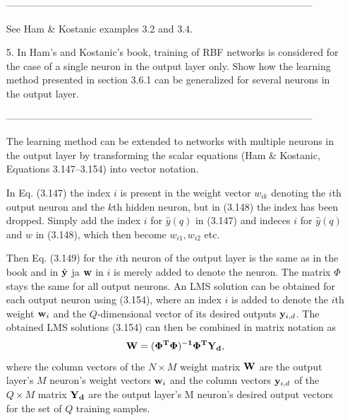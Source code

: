 \documentclass[10pt]{article}
\begin{document}
\begin{enumerate}
---------------------------------------------------------------------------------------------

See Ham \& Kostanic examples 3.2 and 3.4.

\vspace{2mm}

\vspace{2cm}
\item[5.] In Ham's and Kostanic's book, training of RBF networks is considered for the
  case of a single neuron in the output layer only. Show how the learning method
  presented in section 3.6.1 can be generalized for several neurons in the
  output layer.

---------------------------------------------------------------------------------------------

The learning method can be extended to networks with multiple neurons
in the output layer by transforming the scalar equations (Ham \&
Kostanic, Equations 3.147--3.154) into vector notation.

In Eq. (3.147) the index $i$ is present in the weight vector $w_{ik}$
denoting the $i$th output neuron and the $k$th hidden neuron, but in
(3.148) the index has been dropped. Simply add the index $i$ for
$\hat{y}(q)$ in (3.147) and indeces $i$ for $\hat{y}(q)$ and $w$ in
(3.148), which then become $w_{i1}, w_{i2}$ etc.


Then Eq. (3.149) for the $i$th neuron of the output layer is the same
  as in the book and in  $\hat{{\bf y}}$ ja ${\bf w}$ in $i$ is merely
  added to denote the neuron. The matrix $\Phi$ stays the same for all
  output neurons. An LMS solution can be obtained for each output
  neuron using (3.154), where an index $i$
  is added to denote the $i$th weight ${\bf w}_i$ and the
  $Q$-dimensional vector of its desired outputs ${\bf y}_{i,d}$.
  The obtained LMS solutions (3.154) can then be combined in matrix
  notation as
  \[
      \bf{W} = (\Phi^T \Phi)^{-1}\Phi^T \bf{Y}_d,\] 
  where the column vectors of the $N\times M$ weight matrix $\bf{W}$ are the output layer's $M$ neuron's
  weight vectors ${\bf w}_i$ and the column vectors ${\bf y}_{i,d}$ of the $Q \times M$ matrix $\bf{Y}_d$
  are the output layer's M neuron's desired output vectors for the
  set of $Q$ training samples.



\end{enumerate}
\end{document}
